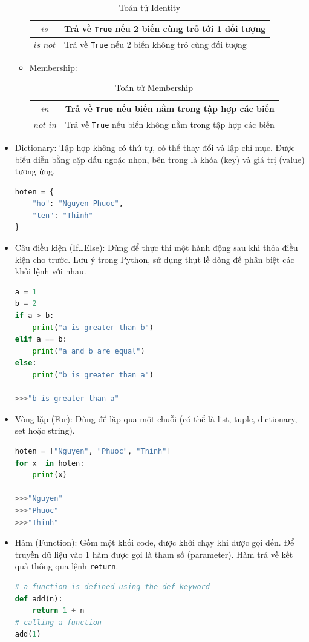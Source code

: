 \begin{itemize}
\begin{itemize}
\begin{table}[!ht]
			\centering
			\begin{tabular}{|c|l|}
				\hline
				$is$ & Trả về \texttt{True} nếu 2 biến cùng trỏ tới 1 đối tượng\\
				\hline
				$is$ $not$ & Trả về \texttt{True} nếu 2 biến không trỏ cùng đối tượng\\
				\hline
			\end{tabular}
			\caption{Toán tử Identity}
		\end{table}
		\item Membership:
		\begin{table}[!ht]
			\centering
			\begin{tabular}{|c|l|}
				\hline
				$in$ & Trả về \texttt{True} nếu biến nằm trong tập hợp các biến\\
				\hline
				$not$ $in$ & Trả về \texttt{True} nếu biến không nằm trong tập hợp các biến\\
				\hline
			\end{tabular}
			\caption{Toán tử Membership}
		\end{table}
	\end{itemize}
	\item Dictionary: Tập hợp không có thứ tự, có thể thay đổi và lập chỉ mục. Được biểu diễn bằng cặp dấu ngoặc nhọn, bên trong là khóa (key) và giá trị (value) tương ứng.
	\begin{lstlisting}[language=Python]
hoten = {
	"ho": "Nguyen Phuoc",
	"ten": "Thinh"
}
	\end{lstlisting}
	\item Câu điều kiện (If\ldots Else): Dùng để thực thi một hành động sau khi thỏa điều kiện cho trước. Lưu ý trong Python, sử dụng thụt lề dòng để phân biệt các khối lệnh với nhau.
	\begin{lstlisting}[language=Python]
a = 1
b = 2
if a > b:
	print("a is greater than b")
elif a == b:
	print("a and b are equal")
else:
	print("b is greater than a")

>>>"b is greater than a"
	\end{lstlisting}
	\item Vòng lặp (For): Dùng để lặp qua một chuỗi (có thể là list, tuple, dictionary, set hoặc string).
	\begin{lstlisting}[language=Python]
hoten = ["Nguyen", "Phuoc", "Thinh"]
for x  in hoten:
	print(x)
	
>>>"Nguyen"
>>>"Phuoc"
>>>"Thinh"
	\end{lstlisting}
	\item Hàm (Function): Gồm một khối code, được khởi chạy khi được gọi đến. Để truyền dữ liệu vào 1 hàm được gọi là tham số (parameter). Hàm trả về kết quả thông qua lệnh \texttt{return}.
	\begin{lstlisting}[language=Python]
# a function is defined using the def keyword
def add(n):
	return 1 + n
# calling a function
add(1)


\end{lstlisting}
\end{itemize}
